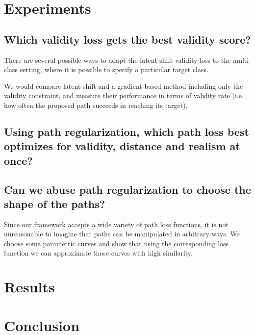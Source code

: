 \documentclass[../main.tex]{subfiles}
\begin{document}
\section{Experiments}

\subsection{Which validity loss gets the best validity score?}

There are several possible ways to adapt the latent shift validity loss to the multi-class setting, where it is possible to specify a particular target class.

We would compare latent shift and a gradient-based method including only the validity constraint, and measure their performance in terms of validity rate (i.e. how often the proposed path succeeds in reaching its target).

\subsection{Using path regularization, which path loss best optimizes for validity, distance and realism at once?}



\subsection{Can we abuse path regularization to choose the shape of the paths?}

Since our framework accepts a wide variety of path loss functions, it is not unreasonable to imagine that paths can be manipulated in arbitrary ways.
We choose some parametric curves and show that using the corresponding loss function we can approximate those curves with high similarity.

\section{Results}

\section{Conclusion}
\end{document}
